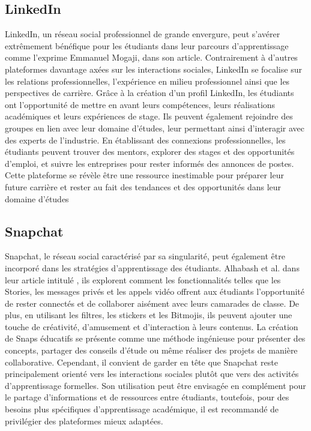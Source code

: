 \documentclass[12pt,a4paper,titlepage]{article}
\begin{document}
\subsection{LinkedIn}
LinkedIn, un réseau social professionnel de grande envergure, peut s'avérer extrêmement bénéfique pour les étudiants dans leur parcours d'apprentissage comme l'exprime Emmanuel Mogaji, dans son article\citep{mogaji2019student}. Contrairement à d'autres plateformes davantage axées sur les interactions sociales, LinkedIn se focalise sur les relations professionnelles, l'expérience en milieu professionnel ainsi que les perspectives de carrière. Grâce à la création d'un profil LinkedIn, les étudiants ont l'opportunité de mettre en avant leurs compétences, leurs réalisations académiques et leurs expériences de stage. Ils peuvent également rejoindre des groupes en lien avec leur domaine d'études, leur permettant ainsi d'interagir avec des experts de l'industrie. En établissant des connexions professionnelles, les étudiants peuvent trouver des mentors, explorer des stages et des opportunités d'emploi, et suivre les entreprises pour rester informés des annonces de postes. Cette plateforme se révèle être une ressource inestimable pour préparer leur future carrière et rester au fait des tendances et des opportunités dans leur domaine d'études 



\subsection{Snapchat}
Snapchat, le réseau social caractérisé par sa singularité, peut également être incorporé dans les stratégies d'apprentissage des étudiants. Alhabash et al. dans leur article intitulé \citep{alhabash2017tale}, ils explorent comment les fonctionnalités telles que les Stories, les messages privés et les appels vidéo offrent aux étudiants l'opportunité de rester connectés et de collaborer aisément avec leurs camarades de classe. De plus, en utilisant les filtres, les stickers et les Bitmojis, ils peuvent ajouter une touche de créativité, d'amusement et d'interaction à leurs contenus. La création de Snaps éducatifs se présente comme une méthode ingénieuse pour présenter des concepts, partager des conseils d'étude ou même réaliser des projets de manière collaborative. Cependant, il convient de garder en tête que Snapchat reste principalement orienté vers les interactions sociales plutôt que vers des activités d'apprentissage formelles. Son utilisation peut être envisagée en complément pour le partage d'informations et de ressources entre étudiants, toutefois, pour des besoins plus spécifiques d'apprentissage académique, il est recommandé de privilégier des plateformes mieux adaptées.
\end{document}
